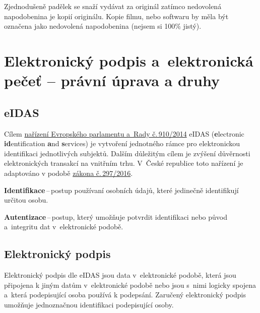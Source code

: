 Zjednodušeně padělek se snaží vydávat za originál zatímco nedovolená napodobenina je kopií originálu. Kopie filmu, nebo softwaru by měla být označena jako nedovolená napodobenina (nejsem si 100\% jistý).






\clearpage
\section[Elektronický podpis a~elektronická pečeť -- právní úprava a~druhy]{Elektronický podpis a~elektronická pečeť -- \newline právní úprava a druhy}

\vspace{-0,4cm}
\subsection{eIDAS}
\vspace{-0,4cm}

Cílem \href{https://eur-lex.europa.eu/legal-content/CS/TXT/?uri=CELEX\%3A32014R0910}{nařízení Evropského parlamentu a~Rady č.\,910/2014} eIDAS (\textbf{e}lectronic \textbf{id}entification \textbf{a}nd \textbf{s}ervices) je vytvoření jednotného rámce pro elektronickou identifikaci jednotlivých subjektů. Dalším důležitým cílem je zvýšení důvěrnosti elektronických transakcí na vnitřním trhu. V~České republice toto nařízení je adaptováno v podobě \href{https://www.zakonyprolidi.cz/cs/2016-297}{zákona č.\,297/2016}.

\textbf{Identifikace}\,--\,postup používaní osobních údajů, které jedinečně identifikují určitou osobu.

\textbf{Autentizace}\,--\,postup, který umožňuje potvrdit identifikaci nebo původ a~integritu dat v~elektronické podobě.

\vspace{-0,4cm}
\subsection{Elektronický podpis}
\vspace{-0,4cm}

Elektronický podpis dle eIDAS jsou data v~elektronické podobě, která jsou připojena k jiným datům v~elektronické podobě nebo jsou s~nimi logicky spojena a~která podepisující osoba používá k podepsání. Zaručený elektronický podpis umožňuje jednoznačnou identifikaci podepisující osoby. 

